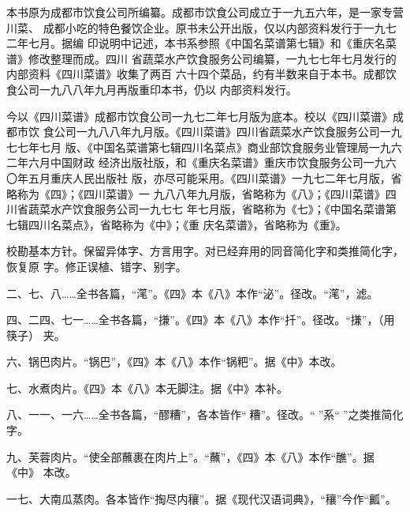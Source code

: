 \begin{list}{}{%
	\setlength{\topsep}{0pt}%
	\setlength{\leftmargin}{.529166mm}%
	\setlength{\rightmargin}{.529166mm}%
	\setlength{\listparindent}{\parindent}%
	\setlength{\itemindent}{\parindent}%
	\setlength{\parsep}{\parskip}%
	\addtolength{\textheight}{2.800042mm}%
}%
\item[]%

\vspace{0\baselineskip plus .5\baselineskip}%

本书原为成都市饮食公司所编纂。成都市饮食公司成立于一九五六年，是一家专营川菜、
成都小吃的特色餐饮企业。原书未公开出版，仅以内部资料发行于一九七二年七月。据编
印说明中记述，本书系参照《中国名菜谱第七辑》和《重庆名菜谱》修改整理而成。四川
省蔬菜水产饮食服务公司编纂，一九七七年七月发行的内部资料《四川菜谱》收集了两百
六十四个菜品，约有半数来自于本书。成都饮食公司一九八八年九月再版重印本书，仍以
内部资料发行。

今以《四川菜谱》成都市饮食公司一九七二年七月版为底本。校以《四川菜谱》成都市饮
食公司一九八八年九月版。《四川菜谱》四川省蔬菜水产饮食服务公司一九七七年七月
版、《中国名菜谱第七辑四川名菜点》商业部饮食服务业管理局一九六二年六月中国财政
经济出版社版，和《重庆名菜谱》重庆市饮食服务公司一九六〇年五月重庆人民出版社
版，亦尽可能采用。《四川菜谱》一九七二年七月版，省略称为《四》；《四川菜谱》一
九八八年九月版，省略称为《八》；《四川菜谱》四川省蔬菜水产饮食服务公司一九七七
年七月版，省略称为《七》；《中国名菜谱第七辑四川名菜点》，省略称为《中》；《重
庆名菜谱》，省略称为《重》。

校勘基本方针。保留异体字、方言用字。对已经弃用的同音简化字和类推简化字，恢复原
字。修正误植、错字、别字。

\vspace{1\baselineskip}%

二、七、八……全书各篇，“滗”。《四》本《八》本作“泌”。径改。“滗”，滤。

四、二四、七一……全书各篇，“搛”。《四》本《八》本作“扦”。径改。“搛”，（用筷子）
夹。

六、锅巴肉片。“锅巴”，《四》本《八》本作“锅粑”。据《中》本改。

七、水煮肉片。《四》本《八》本无脚注{\footnotesize{}}。据《中》本补。

八、一一、一六……全书各篇，“醪糟”，各本皆作“𰪿糟”。径改。“𰪿”系“𫃑”之类推简化
字。

九、芙蓉肉片。“使全部蘸裹在肉片上”。“蘸”，《四》本《八》本作“醮”。据《中》
本改。

一七、大南瓜蒸肉。各本皆作“掏尽内穰”。据《现代汉语词典》，“穰”今作“瓤”。


\end{list}
